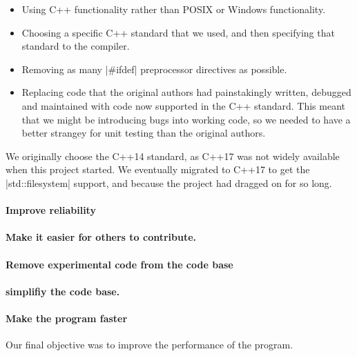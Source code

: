 \documentclass[5p]{elsarticle}
\begin{document}
\begin{itemize}

\item Using C++ functionality rather than POSIX or Windows functionality.

\item Choosing a specific C++ standard that we used, and then specifying that standard to the compiler.

\item Removing as many |#ifdef| preprocessor directives as possible.

\item Replacing code that the original authors had painstakingly written, debugged and
maintained with code now supported in the C++ standard. This meant
that we might be introducing bugs into working code, so we needed to
have a better strangey for unit testing than the original authors.

\end{itemize}

We originally choose the C++14 standard, as C++17 was not widely
available when this project started. We eventually migrated to C++17 to get the
|std::filesystem| support, and because the project had dragged on for
so long.

\paragraph{Improve reliability}

\paragraph{Make it easier for others to contribute.}

\paragraph{Remove experimental code from the code base}

\paragraph{simplifiy the code base.}

\paragraph{Make the program faster}

Our final objective was to improve the performance of the program.
\end{document}
